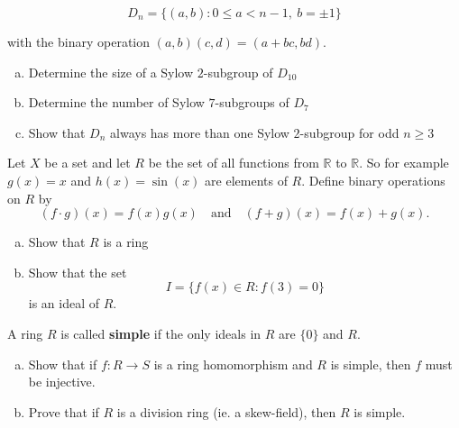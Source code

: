 \documentclass[11pt]{exam}
\theoremstyle{definition}
\begin{document}
\begin{questions}
$$D_n = \{(a,b): 0\leq a < n-1,\ b = \pm 1\}$$

with the binary operation $(a,b)(c,d) = (a + bc, bd)$.

\begin{enumerate}[(a)]
\item  Determine the size of a Sylow $2$-subgroup of $D_{10}$
\vspace{2in}
\item  Determine the number of Sylow $7$-subgroups of $D_7$
\vspace{2in}
\item  Show that $D_n$ always has more than one Sylow $2$-subgroup for odd $n\geq 3$
\end{enumerate}

\newpage
\question[10]\mbox{}

Let $X$ be a set and let $R$ be the set of all functions from $\mathbb R$ to $\mathbb R$.  So for example $g(x) = x$ and $h(x)=\sin(x)$ are elements of $R$.
Define binary operations on $R$ by
$$(f\cdot g)(x) = f(x)g(x)\quad\text{and}\quad (f+g)(x) = f(x) + g(x).$$

\begin{enumerate}[(a)]
\item Show that $R$ is a ring
\vspace{3in}
\item Show that the set
$$I = \{f(x)\in R: f(3) = 0\}$$
is an ideal of $R$.
\end{enumerate}


\newpage
\question[10]\mbox{}

A ring $R$ is called \textbf{simple} if the only ideals in $R$ are $\{0\}$ and $R$.

\begin{enumerate}[(a)]
\item  Show that if $f: R\rightarrow S$ is a ring homomorphism and $R$ is simple, then $f$ must be injective.
\vspace{3in}
\item  Prove that if $R$ is a division ring (ie. a skew-field), then $R$ is simple.
\end{enumerate}


\end{questions}
\end{document}
